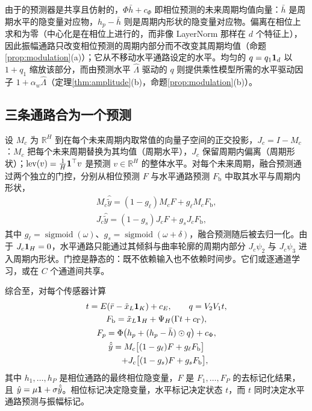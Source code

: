 {
由于的预测器是共享且仿射的，$\Phi\bar h+c_\Phi$ 即相位预测的未来周期均值向量：$\bar h$ 是周期水平的隐变量对应物，$h_p-\bar h$ 则是周期内形状的隐变量对应物。偏离在相位上求和为零（中心化是在相位上进行的，而非像 LayerNorm 那样在 $d$ 个特征上），因此振幅通路只改变相位预测的周期内部分而不改变其周期均值（命题\ref{prop:modulation}(a)）；它从不移动水平通路设定的水平。均匀的 $q=q_1\mathbf 1_d$ 以 $1+q_1$ 缩放该部分，而由预测水平 $\hat\Lambda$ 驱动的 $q$ 则提供乘性模型所需的水平驱动因子 $1+\alpha_w\hat\Lambda$（定理\ref{thm:amplitude}(b)，命题\ref{prop:modulation}(b)）。

\subsection{三条通路合为一个预测}
\label{sec:ext_init}

设 $M_c$ 为 $\mathbb R^H$ 到在每个未来周期内取常值的向量子空间的正交投影，$J_c=I-M_c$：$M_c$ 把每个未来周期替换为其均值（周期水平），$J_c$ 保留周期内偏离（周期形状）；$\operatorname{lev}(v)=\tfrac1H\mathbf 1^\top v$ 是预测 $v\in\mathbb R^H$ 的整体水平。对每个未来周期，融合预测通过两个独立的门控，分别从相位预测 $F$ 与水平通路预测 $F_{\mathrm b}$ 中取其水平与周期内形状，
\begin{equation}
\begin{gathered}
M_c\hat{\tilde y}=(1-g_\ell)M_cF+g_\ell M_cF_{\mathrm b},\\
J_c\hat{\tilde y}=(1-g_s)J_cF+g_sJ_cF_{\mathrm b},
\end{gathered}
\label{eq:fusion}
\end{equation}
其中 $g_\ell=\operatorname{sigmoid}(\omega)$、$g_s=\operatorname{sigmoid}(\omega+\delta)$，融合预测随后被去归一化。由于 $J_c\mathbf 1_H=0$，水平通路只能通过其倾斜与曲率轮廓的周期内部分 $J_c\psi_2$ 与 $J_c\psi_3$ 进入周期内形状。门控是静态的：既不依赖输入也不依赖时间步。它们或逐通道学习，或在 $C$ 个通道间共享。

综合至，\sysplus 对每个传感器计算
\begin{equation}
\begin{gathered}
t=E(\bar r-\tilde x_L\mathbf 1_K)+c_E,\qquad q=V_2V_1t,\\
F_{\mathrm b}=\tilde x_L\mathbf 1_H+\Psi_H(\Gamma t+c_\Gamma),\\
F_p=\Phi\big(h_p+(h_p-\bar h)\odot q\big)+c_\Phi,\\
\hat{\tilde y}=M_c\big[(1-g_\ell)F+g_\ell F_{\mathrm b}\big]\\
\qquad+J_c\big[(1-g_s)F+g_sF_{\mathrm b}\big],
\end{gathered}
\label{eq:forward}
\end{equation}
其中 $h_1,\dots,h_P$ 是相位通路的最终相位隐变量，$F$ 是 $F_1,\dots,F_P$ 的去标记化结果，且 $\hat y=\mu\mathbf 1+\sigma\hat{\tilde y}$。相位标记决定隐变量，水平标记决定状态 $t$，而 $t$ 同时决定水平通路预测与振幅标记。

}
